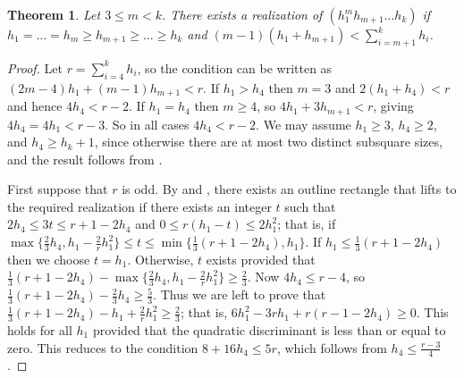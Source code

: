 \documentclass{sn-jnl}
\newtheorem{theorem}{Theorem}[section]
\theoremstyle{definition}
\begin{document}
\begin{theorem}
Let $3\le m < k$. There exists a realization of $(h_1^mh_{m+1}\dots h_k)$ if $h_1 = \dots = h_m \ge h_{m+1} \ge \dots \ge h_k$ and $(m-1)(h_1+h_{m+1}) < \sum_{i=m+1}^k h_i$. 
\label{jl_combined_construction}
\end{theorem}
\begin{proof}

Let $r=\sum_{i=4}^k h_i$, so the condition can be written as $(2m-4)h_1+(m-1)h_{m+1}<r$. If $h_1>h_4$ then $m=3$ and $2(h_1+h_4)<r$ and hence $4h_4 < r-2$. If $h_1=h_4$ then $m \ge 4$, so $4h_1+3h_{m+1}<r$, giving $4h_4=4h_1<r-3$. So in all cases $4h_4<r-2$.
We may assume $h_1 \ge 3$, $h_4 \ge 2$, and $h_4 \ge h_k+1$, since otherwise there are at most two distinct subsquare sizes, and the result follows from .

First suppose that $r$ is odd. By  and , there exists an outline rectangle that lifts to the required realization if there exists an integer $t$ such that $2h_4 \le 3t \le r+1-2h_4$ and $0 \le r(h_1-t) \le 2h_1^2$; that is, if  $\max\{\frac{2}{3}h_4,h_1-\frac{2}{r}h_1^2 \}\leq t\leq \min\{ \frac{1}{3}(r+1-2h_4), h_1 \}$. 
If $h_1 \le \frac{1}{3}(r+1-2h_4)$ then we choose $t=h_1$.
Otherwise, $t$ exists provided that 
$\frac{1}{3}(r+1-2h_4) - \max\{\frac{2}{3}h_4,h_1-\frac{2}{r}h_1^2 \} \ge \frac{2}{3}$.
Now $4h_4 \leq r-4$, so $\frac{1}{3}(r+1-2h_4) - \frac{2}{3}h_4 \geq \frac{5}{3}$. Thus we are left to prove that
$\frac{1}{3}(r+1-2h_4) - h_1+\frac{2}{r}h_1^2 \geq \frac{2}{3}$; that is,
$6h_1^2-3rh_1+r(r-1-2h_4) \geq 0$. This holds for all $h_1$ provided that the quadratic discriminant is less than or equal to zero. This reduces to the condition $8+16h_4 \leq 5r$, which follows from $h_4 \leq \frac{r-3}{4}$.


\end{proof}
\end{document}

